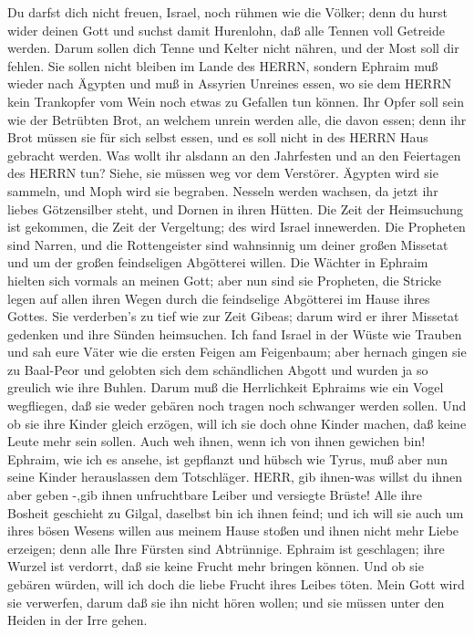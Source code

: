  Du darfst dich nicht freuen, Israel, noch rühmen wie die
Völker; denn du hurst wider deinen Gott und suchst damit Hurenlohn, daß
alle Tennen voll Getreide werden.  Darum sollen dich Tenne
und Kelter nicht nähren, und der Most soll dir fehlen.  Sie
sollen nicht bleiben im Lande des HERRN, sondern Ephraim muß wieder nach
Ägypten und muß in Assyrien Unreines essen,  wo sie dem
HERRN kein Trankopfer vom Wein noch etwas zu Gefallen tun können. Ihr
Opfer soll sein wie der Betrübten Brot, an welchem unrein werden alle,
die davon essen; denn ihr Brot müssen sie für sich selbst essen, und es
soll nicht in des HERRN Haus gebracht werden.  Was wollt ihr
alsdann an den Jahrfesten und an den Feiertagen des HERRN tun?
 Siehe, sie müssen weg vor dem Verstörer. Ägypten wird sie
sammeln, und Moph wird sie begraben. Nesseln werden wachsen, da jetzt
ihr liebes Götzensilber steht, und Dornen in ihren Hütten. 
Die Zeit der Heimsuchung ist gekommen, die Zeit der Vergeltung; des wird
Israel innewerden. Die Propheten sind Narren, und die Rottengeister sind
wahnsinnig um deiner großen Missetat und um der großen feindseligen
Abgötterei willen.  Die Wächter in Ephraim hielten sich
vormals an meinen Gott; aber nun sind sie Propheten, die Stricke legen
auf allen ihren Wegen durch die feindselige Abgötterei im Hause ihres
Gottes.  Sie verderben's zu tief wie zur Zeit Gibeas; darum
wird er ihrer Missetat gedenken und ihre Sünden heimsuchen.
 Ich fand Israel in der Wüste wie Trauben und sah eure
Väter wie die ersten Feigen am Feigenbaum; aber hernach gingen sie zu
Baal-Peor und gelobten sich dem schändlichen Abgott und wurden ja so
greulich wie ihre Buhlen.  Darum muß die Herrlichkeit
Ephraims wie ein Vogel wegfliegen, daß sie weder gebären noch tragen
noch schwanger werden sollen.  Und ob sie ihre Kinder
gleich erzögen, will ich sie doch ohne Kinder machen, daß keine Leute
mehr sein sollen. Auch weh ihnen, wenn ich von ihnen gewichen bin!
 Ephraim, wie ich es ansehe, ist gepflanzt und hübsch wie
Tyrus, muß aber nun seine Kinder herauslassen dem Totschläger.
 HERR, gib ihnen-was willst du ihnen aber geben -,gib ihnen
unfruchtbare Leiber und versiegte Brüste!  Alle ihre
Bosheit geschieht zu Gilgal, daselbst bin ich ihnen feind; und ich will
sie auch um ihres bösen Wesens willen aus meinem Hause stoßen und ihnen
nicht mehr Liebe erzeigen; denn alle Ihre Fürsten sind Abtrünnige.
 Ephraim ist geschlagen; ihre Wurzel ist verdorrt, daß sie
keine Frucht mehr bringen können. Und ob sie gebären würden, will ich
doch die liebe Frucht ihres Leibes töten.  Mein Gott wird
sie verwerfen, darum daß sie ihn nicht hören wollen; und sie müssen
unter den Heiden in der Irre gehen.

